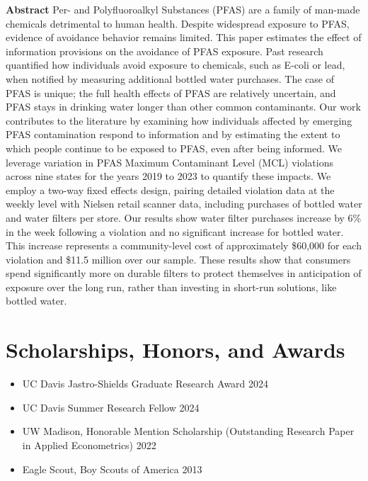 \documentclass{article}[12]
\begin{document}
\begin{itemize}
\textbf{Abstract} Per- and Polyfluoroalkyl Substances (PFAS) are a family of man-made chemicals detrimental to human health. Despite widespread exposure to PFAS, evidence of avoidance behavior remains limited. This paper estimates the effect of information provisions on the avoidance of PFAS exposure. Past research quantified how individuals avoid exposure to chemicals, such as E-coli or lead, when notified by measuring additional bottled water purchases. The case of PFAS is unique; the full health effects of PFAS are relatively uncertain, and PFAS stays in drinking water longer than other common contaminants. Our work contributes to the literature by examining how individuals affected by emerging PFAS contamination respond to information and by estimating the extent to which people continue to be exposed to PFAS, even after being informed. We leverage variation in PFAS Maximum Contaminant Level (MCL) violations across nine states for the years 2019 to 2023 to quantify these impacts. We employ a two-way fixed effects design, pairing detailed violation data at the weekly level with Nielsen retail scanner data, including purchases of bottled water and water filters per store. Our results show water filter purchases increase by 6\% in the week following a violation and no significant increase for bottled water. This increase represents a community-level cost of approximately \$60,000 for each violation and \$11.5 million over our sample. These results show that consumers spend significantly more on durable filters to protect themselves in anticipation of exposure over the long run, rather than investing in short-run solutions, like bottled water.
\end{itemize}

\section{Scholarships, Honors, and Awards}

\begin{itemize}   
    \item UC Davis Jastro-Shields Graduate Research Award \hfill 2024
    \item UC Davis Summer Research Fellow \hfill 2024
    \item UW Madison, Honorable Mention Scholarship (Outstanding Research Paper in Applied Econometrics) \hfill 2022 
    \item Eagle Scout, Boy Scouts of America \hfill 2013 
\end{itemize}
\end{document}
